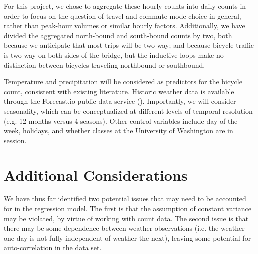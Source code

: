 \documentclass[11pt,letterpaper,article]{memoir} %
\begin{document}
For this project, we chose to aggregate these hourly counts into daily counts in order to focus on the question of travel and commute mode choice in general, rather than peak-hour volumes or similar hourly factors. Additionally, we have divided the aggregated north-bound and south-bound counts by two, both because we anticipate that most trips will be two-way; and because bicycle traffic is two-way on both sides of the bridge, but the inductive loops make no distinction between bicycles traveling northbound or southbound.

Temperature and precipitation will be considered as predictors for the bicycle count, consistent with existing literature. Historic weather data is available through the Forecast.io public data service (\cite{The-Dark-Sky-Company:aa}). Importantly, we will consider seasonality, which can be conceptualized at different levels of temporal resolution (e.g. 12 months versus 4 seasons). Other control variables include day of the week, holidays, and whether classes at the University of Washington are in session.

\chapter*{Additional Considerations}
We have thus far identified two potential issues that may need to be accounted for in the regression model. The first is that the assumption of constant variance may be violated, by virtue of working with count data. The second issue is that there may be some dependence between weather observations (i.e. the weather one day is not fully independent of weather the next), leaving some potential for auto-correlation in the data set.

\printbibliography
\end{document}
